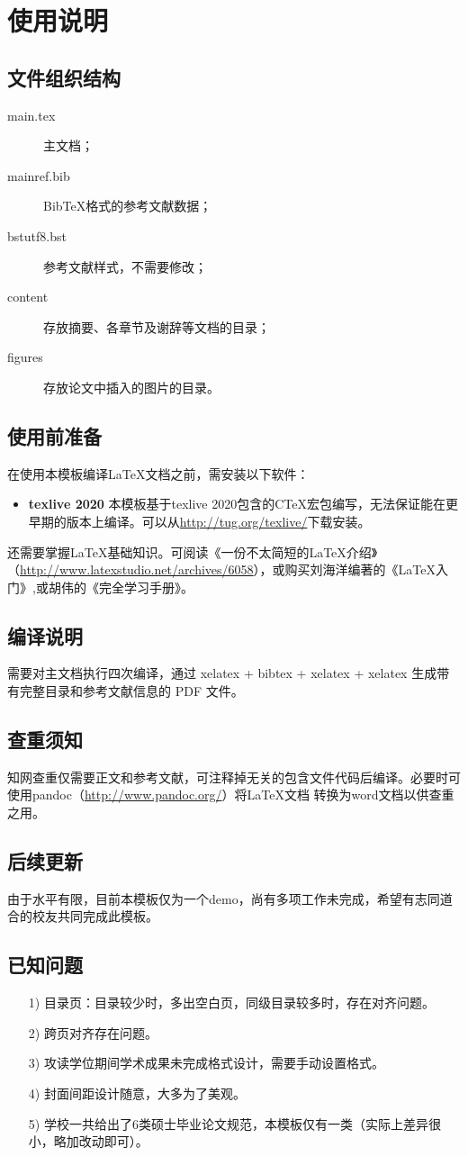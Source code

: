 \chapter{使用说明}


\section{文件组织结构}
\begin{description}
\item[main.tex] 主文档；
\item[mainref.bib] BibTeX格式的参考文献数据；
\item[bstutf8.bst] 参考文献样式，不需要修改；
\item[content] 存放摘要、各章节及谢辞等文档的目录；
\item[figures] 存放论文中插入的图片的目录。
\end{description}
\section{使用前准备}
在使用本模板编译\LaTeX 文档之前，需安装以下软件：
\begin{itemize}

\item{\bf texlive 2020} 本模板基于texlive 2020包含的CTeX宏包编写，无法保证能在更早期的版本上编译。可以从\url{http://tug.org/texlive/}下载安装。
\end{itemize}

还需要掌握\LaTeX 基础知识。可阅读《一份不太简短的\LaTeX 介绍》（\url{http://www.latexstudio.net/archives/6058}），或购买刘海洋编著的《\LaTeX 入门》,或胡伟的《\LaTeXe 完全学习手册》。

\section{编译说明}
需要对主文档执行四次编译，通过 xelatex + bibtex + xelatex + xelatex 生成带有完整目录和参考文献信息的 PDF 文件。

\section{查重须知}
知网查重仅需要正文和参考文献，可注释掉无关的包含文件代码后编译。必要时可使用pandoc（\url{http://www.pandoc.org/}）将\LaTeX 文档 转换为word文档以供查重之用。

\section{后续更新}
由于水平有限，目前本模板仅为一个demo，尚有多项工作未完成，希望有志同道合的校友共同完成此模板。

\section{已知问题}
\begin{itemize}
	\item[1)] 目录页：目录较少时，多出空白页，同级目录较多时，存在对齐问题。
	\item[2)] 跨页对齐存在问题。
	\item[3)] 攻读学位期间学术成果未完成格式设计，需要手动设置格式。
	\item[4)] 封面间距设计随意，大多为了美观。
	\item[5)] 学校一共给出了6类硕士毕业论文规范，本模板仅有一类（实际上差异很小，略加改动即可）。
	
\end{itemize}